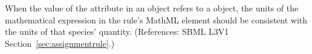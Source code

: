 When the value of the attribute  in an \AssignmentRule
object refers to a \Species object, the units of the mathematical
expression in the rule's MathML  element should be consistent
with the units of that species' quantity.  (References: SBML L3V1
Section~\ref{sec:assignmentrule}.)
